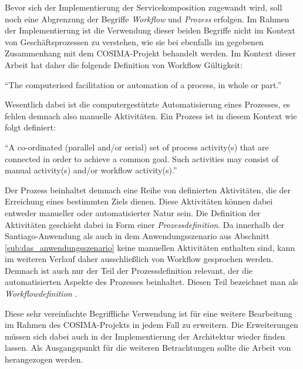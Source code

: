   \begin{kasten}
    \label{msec:der_begriff_workflow}

      Bevor sich der Implementierung der Servicekomposition zugewandt wird, soll noch eine Abgrenzung der Begriffe \emph{Workflow} und \emph{Prozess} erfolgen. Im Rahmen der Implementierung ist die Verwendung dieser beiden Begriffe nicht im Kontext von Geschäftsprozessen zu verstehen, wie sie bei \citep{samma08} ebenfalls im gegebenen Zusammenhang mit dem COSIMA-Projekt behandelt werden. Im Kontext dieser Arbeit hat daher die folgende Definition von Workflow Gültigkeit:
      
      \begin{definition}[Workflow]\label{def:workflow}
        "`The computerised facilitation or automation of a process, in whole or part."' \emph{\citep[S. 54]{hollingsworth1995wmc}}
      \end{definition}
      
      Wesentlich dabei ist die computergestützte Automatisierung eines Prozesses, es fehlen demnach also manuelle Aktivitäten. Ein Prozess ist in diesem Kontext wie folgt definiert:
      
      \begin{definition}[Prozess]\label{def:prozess}
        "`A co-ordinated (parallel and/or serial) set of process activity(s) that are connected in order to achieve a common goal. Such activities may consist of manual activity(s) and/or workflow activity(s)."' \emph{\citep[S. 52]{hollingsworth1995wmc}}
      \end{definition}
      
      Der Prozess beinhaltet demnach eine Reihe von definierten Aktivitäten, die der Erreichung eines bestimmten Ziels dienen. Diese Aktivitäten können dabei entweder manueller oder automatisierter Natur sein. Die Definition der Aktivitäten geschieht dabei in Form einer \emph{Prozessdefinition}. Da innerhalb der Santiago-Anwendung als auch in dem Anwendungsszenario aus Abschnitt \ref{sub:das_anwendungsszenario} keine manuellen Aktivitäten enthalten sind, kann im weiteren Verlauf daher ausschließlich von Workflow gesprochen werden. Demnach ist auch nur der Teil der Prozessdefinition relevant, der die automatisierten Aspekte des Prozesses beinhaltet. Diesen Teil bezeichnet man als \emph{Workflowdefinition} \citep[S. 52]{hollingsworth1995wmc}.
      
      Diese sehr vereinfachte Begriffliche Verwendung ist für eine weitere Bearbeitung im Rahmen des COSIMA-Projekts in jedem Fall zu erweitern. Die Erweiterungen müssen sich dabei auch in der Implementierung der Architektur wieder finden lassen. Als Ausgangspunkt für die weiteren Betrachtungen sollte die Arbeit von \citep{samma08} herangezogen werden.
      
  \end{kasten}

